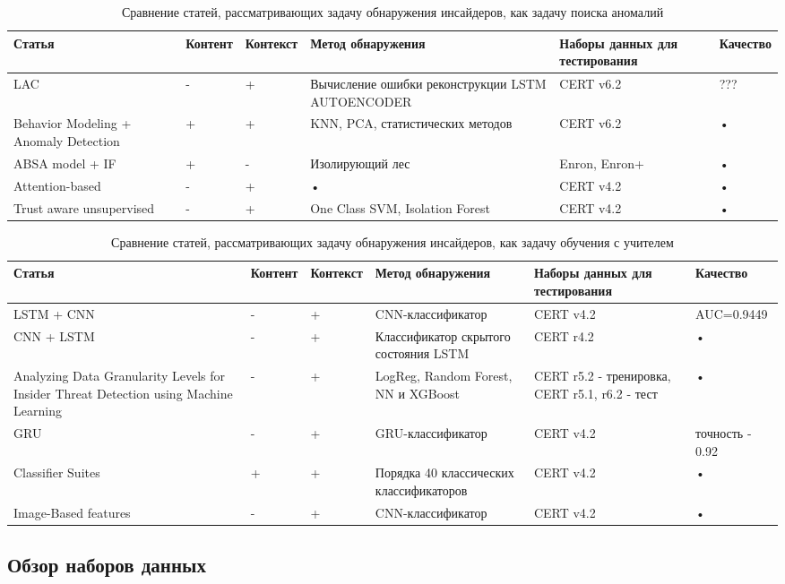 \begin{table}
\caption{Сравнение статей, рассматривающих задачу обнаружения инсайдеров, как задачу поиска аномалий}
\label{table:1} 
\begin{tabular}{|m{2cm}|m{2cm}|m{2cm}|m{2cm}|p{2cm}|p{2cm}|}
\hline 
Статья & Контент & Контекст & Метод обнаружения & Наборы данных для тестирования & Качество \\ 
\hline 
LAC\cite{lac} & - & + & Вычисление ошибки реконструкции LSTM AUTOENCODER& CERT v6.2 & ??? \\ 
\hline 
Behavior Modeling + Anomaly Detection \cite{anomalyalgo} & + & + & KNN, PCA, статистических методов & CERT v6.2 & • \\ 
\hline 
ABSA model + IF \cite{absa} & + & - & Изолирующий лес & Enron, Enron+ & • \\ 
\hline 
Attention-based \cite{attention} & - & + & • & CERT v4.2 & • \\ 
\hline 
Trust aware unsupervised \cite{ocsvm} & - & + & One Class SVM, Isolation Forest & CERT v4.2 & • \\ 
\hline 
\end{tabular}
\end{table}

\begin{table}
\caption{Сравнение статей, рассматривающих задачу обнаружения инсайдеров, как задачу обучения с учителем}
\label{table:2} 
\begin{tabular}{|m{2cm}|m{2cm}|m{2cm}|m{2cm}|p{2cm}|p{2cm}|}
\hline 
Статья & Контент & Контекст & Метод обнаружения & Наборы данных для тестирования & Качество \\ 
\hline 
LSTM + CNN \cite{lstm_cnn} & - & + & CNN-классификатор & CERT v4.2 & AUC=0.9449 \\ 
\hline 
CNN + LSTM \cite{cnn_lstm} & - & + & Классификатор скрытого состояния LSTM & CERT r4.2 & • \\ 
\hline 
Analyzing Data Granularity Levels for Insider Threat Detection using Machine Learning \cite{granual} & - & + & LogReg, Random Forest, NN и XGBoost & CERT r5.2 - тренировка, CERT r5.1, r6.2 - тест   & • \\ 
\hline 
GRU \cite{gru} & - & + & GRU-классификатор & CERT v4.2 & точность - 0.92 \\ 
\hline 
Classifier Suites \cite{suites} & + & + & Порядка 40 классических классификаторов & CERT v4.2 & • \\ 
\hline 
Image-Based features \cite{imagebased} & - & + & CNN-классификатор & CERT v4.2 & • \\ 
\hline
\end{tabular}
\end{table}

\subsection{Обзор наборов данных}
\label{sec:sample}
\clearpage
